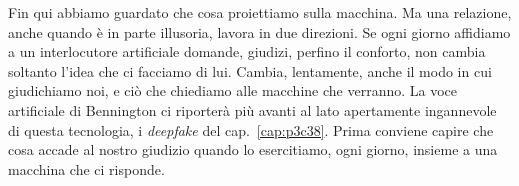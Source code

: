 Fin qui abbiamo guardato che cosa proiettiamo sulla macchina. Ma una relazione, anche quando è in parte illusoria, lavora in due direzioni. Se ogni giorno affidiamo a un interlocutore artificiale domande, giudizi, perfino il conforto, non cambia soltanto l'idea che ci facciamo di lui. Cambia, lentamente, anche il modo in cui giudichiamo noi, e ciò che chiediamo alle macchine che verranno. La voce artificiale di Bennington ci riporterà più avanti al lato apertamente ingannevole di questa tecnologia, i \textit{deepfake} del cap.~\ref{cap:p3c38}. Prima conviene capire che cosa accade al nostro giudizio quando lo esercitiamo, ogni giorno, insieme a una macchina che ci risponde.
